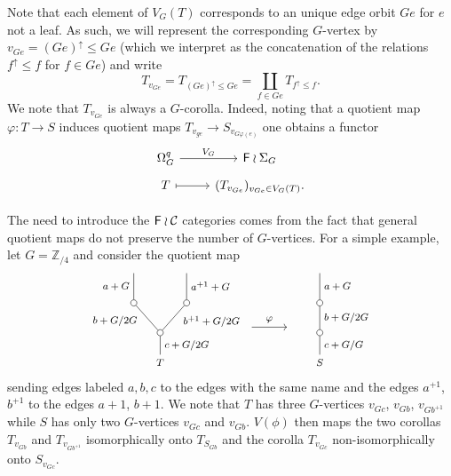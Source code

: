 \documentclass[a4paper,10pt]{article}%
\begin{document}
Note that each element of $V_G(T)$ corresponds to an unique edge orbit $Ge$ for $e$ not a leaf. As such, we will represent the corresponding $G$-vertex by $v_{Ge}=(Ge)^{\uparrow} \leq Ge$ (which we interpret as the concatenation of the relations $f^{\uparrow} \leq f$ for $f \in G e$) and write
\[T_{v_{Ge}}=T_{(Ge)^{\uparrow} \leq Ge} = \coprod_{f\in Ge} T_{f^{\uparrow}\leq f}.\]
We note that $T_{v_{Ge}}$ is always a $G$-corolla. Indeed, noting that a quotient map $\varphi \colon T \to S$ induces quotient maps 
$T_{v_{ge}} \to S_{v_{G\varphi(e)}}$ one obtains a functor
	\begin{equation}\label{VFUNCTOR EQ}
		\begin{tikzcd}[row sep=tiny]
		\Omega_G^q \ar{r}{V_G} & \Fin \wr \Sigma_G \\
		T \ar[mapsto]{r} & (T_{v_{Ge}})_{v_{Ge} \in V_G(T)}.
		\end{tikzcd}	
	\end{equation}

\begin{remark}
	The need to introduce the $\mathsf{F} \wr \mathcal{C}$ categories comes from the fact that general quotient maps do not preserve the number of $G$-vertices. For a simple example, let $G=\mathbb{Z}_{/4}$ and consider the quotient map
		\[
		\begin{tikzpicture}[grow=up,auto,level distance=2.4em,every node/.style = {font=\footnotesize},dummy/.style={circle,draw,inner sep=0pt,minimum size=1.75mm}]
		\node at (0,0) {$T$}
			child{node [dummy] {}
				child{node [dummy] {}
					child{
					edge from parent node [swap] {$a^{+1} + G$}}
				edge from parent node[near end,swap] {$b^{+1} + G/2G$}}
				child{node [dummy] {}
					child{
					edge from parent node {$a + G$}}
				edge from parent node [near end] {$b + G/2G$}}		
			edge from parent node[swap] {$c + G/2G$}};
		\node at (4.53,0) {$S$}
			child{node [dummy] {}
				child{node [dummy] {}
					child{
					edge from parent node [swap] {$a + G$}}
				edge from parent node [swap] {$b + G/2G$}}
			edge from parent node [swap] {$c + G/G$}};
		\draw[->] (2.6,1) -- node [above] {$\varphi$} (3.6,1) ;
		\end{tikzpicture}
		\]
sending edges labeled $a,b,c$ to the edges with the same name and the edges $a^{+1}$, $b^{+1}$ to the edges $a+1$, $b+1$. We note that $T$ has three $G$-vertices $v_{Gc}$, $v_{Gb}$, $v_{Gb^{+1}}$ while $S$ has only two $G$-vertices $v_{Gc}$ and $v_{Gb}$. $V(\phi)$ then maps the two corollas 
$T_{v_{Gb}}$ and $T_{v_{G b^{+1}}}$
isomorphically onto $T_{S_{Gb}}$
and the corolla $T_{v_{Gc}}$ non-isomorphically onto $S_{v_{Gc}}$.
\end{remark}
\end{document}
